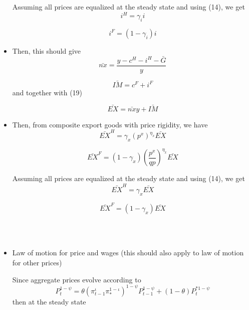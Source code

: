 \documentclass[11pt,titlepage]{article}
\begin{document}
\begin{itemize}
Assuming all prices are equalized at the steady state and using (14), we get
\begin{equation}
i^{H} = \gamma_i i
\end{equation}

\begin{equation}
i^{F} = (1-\gamma_i) i
\end{equation}

\item Then, this should give
\begin{equation}
\bar{nx} = \frac{y-c^{H}-i^{H}-\bar{G}}{y}
\end{equation}

\begin{equation}
\bar{IM} = c^{F} + i^{F}
\end{equation}
and together with (19)

\begin{equation}
\bar{EX} = \bar{nx}y + \bar{IM}
\end{equation}

\item Then, from composite export goods with price rigidity, we have
\begin{equation*}
\bar{EX}^{H} = \gamma_x (p^x)^{\eta_x} \bar{EX}
\end{equation*}

\begin{equation*}
\bar{EX}^{F} = (1-\gamma_x) \left(\frac{p^{x}}{q p}\right)^{\eta_x}\bar{EX}
\end{equation*}

Assuming all prices are equalized at the steady state and using (14), we get
\begin{equation}
\bar{EX}^{H} = \gamma_x \bar{EX}
\end{equation}

\begin{equation}
\bar{EX}^{F} = (1-\gamma_x) \bar{EX}
\end{equation}

~\\~

\item Law of motion for price and wages (this should also apply to law of motion for other prices)

Since aggregate prices evolve according to
\begin{equation*}
P_{t}^{1-\psi} = \theta \left(\pi_{t-1}^{\iota}\pi_{*}^{1-\iota}\right)^{1-\psi}P_{t-1}^{1-\psi} + \left(1-\theta\right)P_{t}^{*1-\psi}
\end{equation*}
then at the steady state


\end{itemize}
\end{document}
